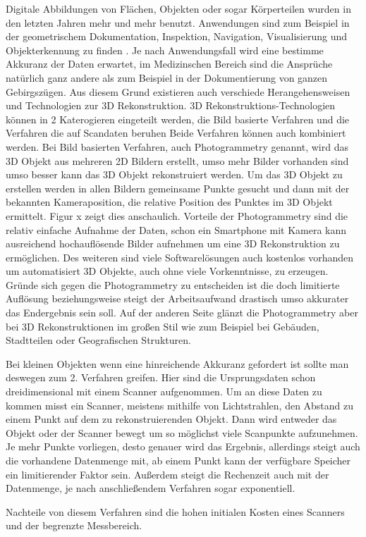 \documentclass[../main.tex]{subfiles}
\begin{document}
Digitale Abbildungen von Flächen, Objekten oder sogar Körperteilen wurden in den
letzten Jahren mehr und mehr benutzt. Anwendungen sind zum Beispiel in der
geometrischem Dokumentation, Inspektion, Navigation, Visualisierung und 
Objekterkennung zu finden \cite{Verykokou.2023}. Je nach Anwendungsfall wird eine bestimme Akkuranz
der Daten erwartet, im Medizinschen Bereich sind die Ansprüche natürlich ganz 
andere als zum Beispiel in der Dokumentierung von ganzen Gebirgszügen.
Aus diesem Grund existieren auch verschiede Herangehensweisen und Technologien  
zur 3D Rekonstruktion.
3D Rekonstruktions-Technologien können in 2 Katerogieren eingeteilt werden,
die Bild basierte Verfahren und die Verfahren die auf Scandaten beruhen \cite{Verykokou.2023}
Beide Verfahren können auch kombiniert werden. 
Bei Bild basierten Verfahren, auch Photogrammetry genannt, wird das 3D Objekt aus
mehreren 2D Bildern erstellt, umso mehr Bilder vorhanden sind umso besser kann das
3D Objekt rekonstruiert werden. Um das 3D Objekt zu erstellen werden in 
allen Bildern gemeinsame Punkte gesucht und dann mit der bekannten Kameraposition, 
die relative Position des Punktes im 3D Objekt ermittelt. Figur x zeigt dies 
anschaulich.
Vorteile der Photogrammetry sind die relativ einfache Aufnahme der Daten, schon
ein Smartphone mit Kamera kann ausreichend hochauflösende Bilder aufnehmen um 
eine 3D Rekonstruktion zu ermöglichen. Des weiteren sind viele Softwarelösungen
auch kostenlos vorhanden um automatisiert 3D Objekte, auch ohne viele 
Vorkenntnisse, zu erzeugen.
Gründe sich gegen die Photogrammetry zu entscheiden ist die doch limitierte 
Auflösung beziehungsweise steigt der Arbeitsaufwand drastisch umso akkurater
das Endergebnis sein soll. Auf der anderen Seite glänzt die Photogrammetry aber 
bei 3D Rekonstruktionen im großen Stil wie zum Beispiel bei Gebäuden, Stadtteilen
oder Geografischen Strukturen.

Bei kleinen Objekten wenn eine hinreichende Akkuranz gefordert ist sollte man 
deswegen zum 2. Verfahren greifen. Hier sind die Ursprungsdaten schon 
dreidimensional mit einem Scanner aufgenommen. Um an diese Daten zu kommen 
misst ein Scanner, meistens mithilfe von Lichtstrahlen, den Abstand zu einem 
Punkt auf dem zu rekonstruierenden Objekt. Dann wird entweder das Objekt oder 
der Scanner bewegt um so möglichst viele Scanpunkte aufzunehmen.
Je mehr Punkte vorliegen, desto genauer wird das Ergebnis, allerdings steigt
auch die vorhandene Datenmenge mit, ab einem Punkt kann der verfügbare 
Speicher ein limitierender Faktor sein. Außerdem steigt die Rechenzeit auch mit
der Datenmenge, je nach anschließendem Verfahren sogar exponentiell.

Nachteile von diesem Verfahren sind die hohen initialen Kosten eines Scanners 
und der begrenzte Messbereich. 
\end{document}
